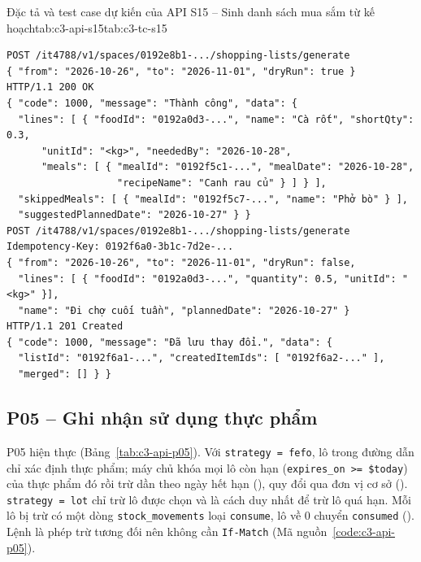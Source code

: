 \begin{apispec}{Đặc tả và test case dự kiến của API S15 -- Sinh danh sách mua sắm từ kế hoạch}{tab:c3-api-s15}{tab:c3-tc-s15}
\end{apispec}

\apiNeed{3.4cm}
\begin{Verbatim}[fontsize=\scriptsize]
POST /it4788/v1/spaces/0192e8b1-.../shopping-lists/generate
{ "from": "2026-10-26", "to": "2026-11-01", "dryRun": true }
HTTP/1.1 200 OK
{ "code": 1000, "message": "Thành công", "data": {
  "lines": [ { "foodId": "0192a0d3-...", "name": "Cà rốt", "shortQty": 0.3,
      "unitId": "<kg>", "neededBy": "2026-10-28",
      "meals": [ { "mealId": "0192f5c1-...", "mealDate": "2026-10-28",
                   "recipeName": "Canh rau củ" } ] } ],
  "skippedMeals": [ { "mealId": "0192f5c7-...", "name": "Phở bò" } ],
  "suggestedPlannedDate": "2026-10-27" } }
POST /it4788/v1/spaces/0192e8b1-.../shopping-lists/generate
Idempotency-Key: 0192f6a0-3b1c-7d2e-...
{ "from": "2026-10-26", "to": "2026-11-01", "dryRun": false,
  "lines": [ { "foodId": "0192a0d3-...", "quantity": 0.5, "unitId": "<kg>" }],
  "name": "Đi chợ cuối tuần", "plannedDate": "2026-10-27" }
HTTP/1.1 201 Created
{ "code": 1000, "message": "Đã lưu thay đổi.", "data": {
  "listId": "0192f6a1-...", "createdItemIds": [ "0192f6a2-..." ],
  "merged": [] } }
\end{Verbatim}

\subsection{P05 – Ghi nhận sử dụng thực phẩm}\label{sssec:api-p05}

P05 hiện thực  (Bảng~\ref{tab:c3-api-p05}). Với \texttt{strategy = fefo}, lô trong đường dẫn chỉ xác định thực phẩm; máy chủ khóa mọi lô còn hạn (\texttt{expires\_on >= \$today}) của thực phẩm đó rồi trừ dần theo ngày hết hạn (), quy đổi qua đơn vị cơ sở (). \texttt{strategy = lot} chỉ trừ lô được chọn và là cách duy nhất để trừ lô quá hạn. Mỗi lô bị trừ có một dòng \texttt{stock\_movements} loại \texttt{consume}, lô về 0 chuyển \texttt{consumed} (). Lệnh là phép trừ tương đối nên không cần \texttt{If-Match} (Mã nguồn~\ref{code:c3-api-p05}).


